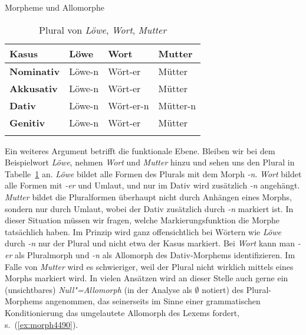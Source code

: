 \begin{Vertiefung}{Morpheme und Allomorphe}
\begin{table}[!htbp]
  \begin{tabular}{llll}
 \lsptoprule
    \textbf{Kasus} & \textbf{Löwe} & \textbf{Wort} & \textbf{Mutter} \\
    \midrule
     \textbf{Nominativ} & Löwe-n & Wört-er   & Mütter   \\
     \textbf{Akkusativ} & Löwe-n & Wört-er   & Mütter   \\
     \textbf{Dativ}     & Löwe-n & Wört-er-n & Mütter-n \\
     \textbf{Genitiv}   & Löwe-n & Wört-er   & Mütter   \\
    \lspbottomrule
  \end{tabular}
  \caption{Plural von \textit{Löwe}, \textit{Wort}, \textit{Mutter}}
  \label{tab:pluralbeispielmorpheme}
\end{table}

Ein weiteres Argument betrifft die funktionale Ebene.
Bleiben wir bei dem Beispielwort \textit{Löwe}, nehmen \textit{Wort} und \textit{Mutter} hinzu und sehen uns den Plural in Tabelle~\ref{tab:pluralbeispielmorpheme} an.
\textit{Löwe} bildet alle Formen des Plurals mit dem Morph \textit{-n}.
\textit{Wort} bildet alle Formen mit \textit{-er} und Umlaut, und nur im Dativ wird zusätzlich \textit{-n} angehängt.
\textit{Mutter} bildet die Pluralformen überhaupt nicht durch Anhängen eines Morphs, sondern nur durch Umlaut, wobei der Dativ zusätzlich durch \textit{-n} markiert ist.
In dieser Situation müssen wir fragen, welche Markierungsfunktion die Morphe tatsächlich haben.
Im Prinzip wird ganz offensichtlich bei Wörtern wie \textit{Löwe} durch \textit{-n} nur der Plural und nicht etwa der Kasus markiert.
Bei \textit{Wort} kann man \textit{-er} als Pluralmorph und \textit{-n} als Allomorph des Dativ-Morphems identifizieren.
Im Falle von \textit{Mutter} wird es schwieriger, weil der Plural nicht wirklich mittels eines Morphs markiert wird.
In vielen Ansätzen wird an dieser Stelle auch gerne ein (unsichtbares) \textit{Null"=Allomorph} (in der Analyse \zB als $\emptyset$ notiert) des Plural-Morphems angenommen, das seinerseits im Sinne einer grammatischen Konditionierung das umgelautete Allomorph des Lexems fordert, s.\ (\ref{ex:morph4490}).

\begin{exe}
\end{exe}


\end{Vertiefung}

